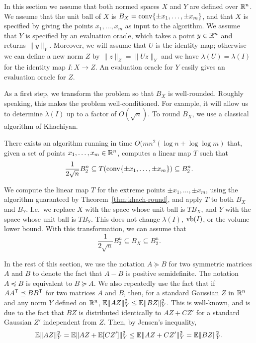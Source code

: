 In this section we assume that both normed spaces $X$ and $Y$ are
defined over ${\mathbb{R}}^n$. We assume that the unit ball of $X$ is $B_X =
\operatorname{conv}\{\pm x_1, \ldots, \pm x_m\}$, and that $X$ is specified by
giving the points $x_1, \ldots, x_m$ as input to the algorithm. We
assume that $Y$ is specified by an evaluation oracle, which takes a
point $y \in {\mathbb{R}}^n$ and returns $\|y\|_Y$. Moreover, we will assume
that $U$ is the identity map; otherwise we can define a new norm $Z$
by $\|z\|_Z = \|Uz\|_Y$ and we have $\lambda(U) = \lambda(I)$ for the
identity map $I:X \to Z$. An evaluation oracle for $Y$ easily gives an
evaluation oracle for $Z$.

As a first step, we transform the problem so that $B_X$ is
well-rounded. Roughly speaking, this makes the problem
well-conditioned. For example, it will allow us to determine
$\lambda(I)$ up to a factor of $O(\sqrt{n})$. To round
$B_X$, we use a classical algorithm of Khachiyan.

\begin{theorem}\label{thm:khach-round}
  There exists an algorithm running in time $O(mn^2(\log n + \log \log
  m)$ that, given a set of points $x_1, \ldots, x_m \in {\mathbb{R}}^n$,
  computes a linear map $T$ such that 
  \[
  \frac{1}{2\sqrt{n}} B_2^n \subseteq T(\operatorname{conv}\{\pm x_1, \ldots, \pm  x_m\})
  \subseteq
  B_2^n.
  \]
\end{theorem}

We compute the linear map $T$ for the extreme points $\pm x_1, \ldots,
\pm x_m$, using the algorithm guaranteed by
Theorem~\ref{thm:khach-round}, and apply $T$ to both $B_X$ and
$B_Y$. I.e.~we replace $X$ with the space whose unit ball is $TB_X$,
and $Y$ with the space whose unit ball is $TB_Y$. This does not change
$\lambda(I)$, $\operatorname{vb}(I)$, or the volume lower bound. With this
transformation, we can assume that 
\begin{equation}\label{eq:rounded}
  \frac{1}{2\sqrt{n}} B_2^n \subseteq B_X \subseteq B_2^n.
\end{equation}

In the rest of this section, we use the notation $A \succeq B$ for two symmetric matrices $A$ and $B$ to denote the fact
that $A-B$ is positive semidefinite. The
notation $A\preceq B$ is equivalent to $B \succeq A$. We also
repeatedly use the fact that if $AA^\mathsf T \preceq BB^\mathsf T$ for two matrices
$A$ and $B$, then, for a standard Gaussian $Z$ in ${\mathbb{R}}^n$ and any norm
$Y$ defined on ${\mathbb{R}}^n$, $\mathbb{E} \|AZ\|^2_Y \leq \mathbb{E} \|BZ\|_Y^2$. This is
well-known, and is due to the fact that $BZ$ is distributed
identically to $AZ + CZ'$
for a standard Gaussian $Z'$ independent from $Z$. Then, by Jensen's inequality,
\[
\mathbb{E}\|AZ\|^2_Y = \mathbb{E}\|AZ + \mathbb{E}[CZ']\|^2_Y
\le \mathbb{E}\|AZ + CZ'\|_Y^2 = \mathbb{E}\|BZ\|_Y^2.
\]


